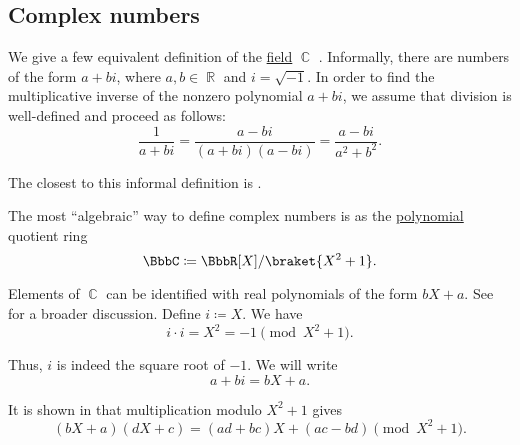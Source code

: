 \subsection{Complex numbers}\label{subsec:complex_numbers}

\begin{definition}\label{def:complex_numbers}
  We give a few equivalent definition of the \hyperref[def:field]{field} \( \BbbC \) . Informally, there are numbers of the form \( a + bi \), where \( a, b \in \BbbR \) and \( i = \sqrt{-1} \). In order to find the multiplicative inverse of the nonzero polynomial \( a + bi \), we assume that division is well-defined and proceed as follows:
  \begin{equation}\label{def:complex_numbers/inverse}
    \frac 1 {a + bi} = \frac {a - bi} {(a + bi)(a - bi)} = \frac{a - bi}{a^2 + b^2}.
  \end{equation}

  The closest to this informal definition is .

  \begin{thmenum}
     The most \enquote{algebraic} way to define complex numbers is as the \hyperref[def:polynomial_algebra/polynomials]{polynomial} quotient ring
    \begin{equation*}
      \BbbC \coloneqq \BbbR[X] / \braket{X^2 + 1}.
    \end{equation*}

    Elements of \( \BbbC \) can be identified with real polynomials of the form \( bX + a \). See  for a broader discussion.
    Define \( i \coloneqq X \). We have
    \begin{equation*}
      i \cdot i = X^2 = -1 \pmod {X^2 + 1}.
    \end{equation*}

    Thus, \( i \) is indeed the square root of \( -1 \). We will write
    \begin{equation*}
      a + bi = bX + a.
    \end{equation*}

    It is shown in  that multiplication modulo \( X^2 + 1 \) gives
    \begin{equation}\label{def:complex_numbers/polynomials/multiplication}
      (bX + a) (dX + c) = (ad + bc)X + (ac - bd) \pmod {X^2 + 1}.
    \end{equation}


\end{thmenum}
\end{definition}
